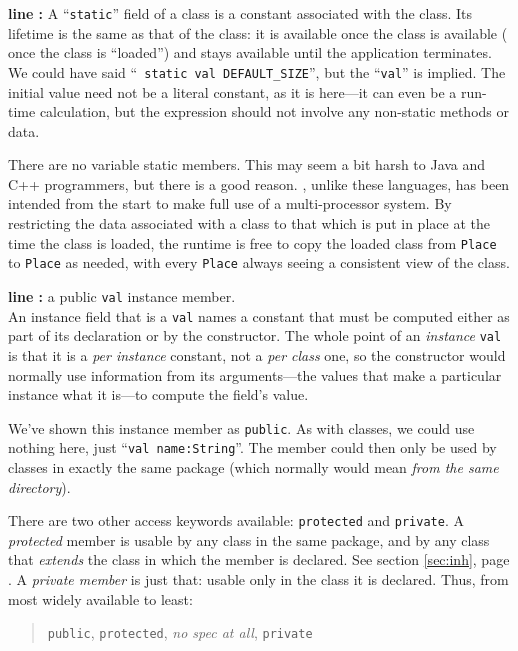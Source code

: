 \begin{description}
\item {\bf line :} 
  A ``{\tt static}'' field of a class is a constant
associated with the class. Its lifetime is the same as that of the class: it
is available once the class is available (\ie{} once the class is ``loaded'')
and stays available until the application terminates.  We could have said ``{\tt
static val DEFAULT\_SIZE}'',  but the ``{\tt val}'' is implied.  The initial
value need not be a literal constant, as it is here---it can even be a run-time
calculation, but the expression should not involve any non-static methods or data.

There are no variable static members.  This may seem a bit harsh to Java and
C++ programmers, but there is a good reason.  \Xten, unlike these languages,
has been intended from the start to make full use of a multi-processor system. 
By restricting the data associated with a class to that which is put in place
at the time the class is loaded, the \Xten{} runtime is free to copy the loaded
class from {\tt Place} to {\tt Place} as needed, with every {\tt Place} always
seeing a consistent view of the class.

\item{\bf line :} a public {\tt val} instance member.\\
An instance field that is a {\tt val} names a constant that
must be computed either as part of its declaration or by the constructor.
The whole point of an {\em
instance} {\tt val} is that it is a {\em per instance} constant, not a {\em per
class} one, so the constructor would normally use information from its
arguments---the values that make a particular instance what it is---to compute
the  field's value.

We've shown this instance member as {\tt public}.  As with classes, we could use nothing
here, just ``{\tt val name:String}''.  The member could then only be used by
classes in exactly the same package (which normally would mean {\em from the
same directory}). 

There are two other access keywords available: {\tt protected} and
{\tt private}.  A {\em protected} member is usable by any  class in the same package,
and by any class that {\em extends} the class in which the member is declared.
See section \ref{sec:inh}, page \pageref{sec:inh}. A {\em private member} is
just that: usable only in the class it is declared.  Thus, from most widely
available to least:
\begin{quote}{\tt public}, {\tt protected}, {\em no spec at all}, {\tt private}\end{quote}


\end{description}
